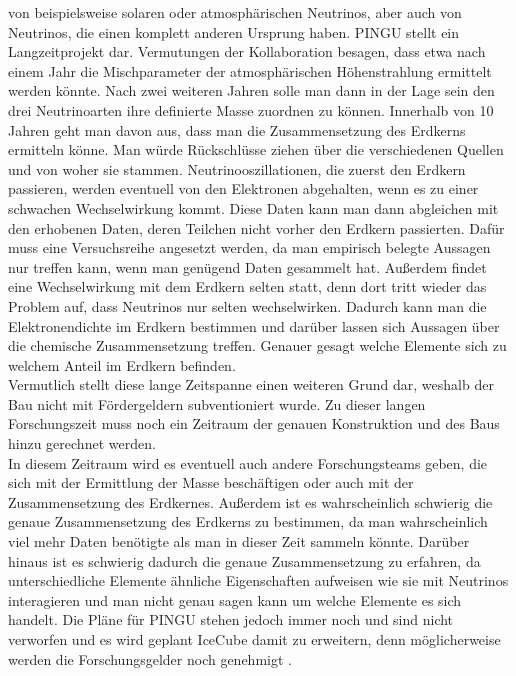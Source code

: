     von beispielsweise solaren oder atmosphärischen Neutrinos, aber auch von Neutrinos, die einen 
    komplett anderen Ursprung haben. PINGU stellt ein Langzeitprojekt dar. Vermutungen der Kollaboration 
    besagen, dass etwa nach einem Jahr die Mischparameter der atmosphärischen Höhenstrahlung ermittelt 
    werden könnte. Nach zwei weiteren Jahren solle man dann in der Lage sein den drei Neutrinoarten 
    ihre definierte Masse zuordnen zu können. Innerhalb von 10 Jahren geht man davon aus, dass man die 
    Zusammensetzung des Erdkerns ermitteln könne. Man würde Rückschlüsse ziehen über die verschiedenen 
    Quellen und von woher sie stammen. Neutrinooszillationen, die zuerst den Erdkern passieren, werden 
    eventuell von den Elektronen abgehalten, wenn es zu einer schwachen Wechselwirkung kommt. 
    Diese Daten kann man dann abgleichen mit den erhobenen Daten, deren Teilchen nicht vorher den 
    Erdkern passierten. Dafür muss eine Versuchsreihe angesetzt werden, da man empirisch belegte 
    Aussagen nur treffen kann, wenn man genügend Daten gesammelt hat. Außerdem findet eine 
    Wechselwirkung mit dem Erdkern selten statt, denn dort tritt wieder das Problem auf, 
    dass Neutrinos nur selten wechselwirken. Dadurch kann man die Elektronendichte im Erdkern 
    bestimmen und darüber lassen sich Aussagen über die chemische Zusammensetzung treffen. 
    Genauer gesagt welche Elemente sich zu welchem Anteil im Erdkern befinden. \\
    Vermutlich stellt diese lange Zeitspanne einen weiteren Grund dar, weshalb der Bau nicht mit 
    Fördergeldern subventioniert wurde. Zu dieser langen Forschungszeit muss noch ein Zeitraum der 
    genauen Konstruktion und des Baus hinzu gerechnet werden. \\
    In diesem Zeitraum wird es eventuell auch andere Forschungsteams geben, die sich mit der 
    Ermittlung der Masse beschäftigen oder auch mit der Zusammensetzung des Erdkernes. 
    Außerdem ist es wahrscheinlich schwierig die genaue Zusammensetzung des Erdkerns zu bestimmen, 
    da man wahrscheinlich viel mehr Daten benötigte als man in dieser Zeit sammeln könnte. 
    Darüber hinaus ist es schwierig dadurch die genaue Zusammensetzung zu erfahren, da unterschiedliche 
    Elemente ähnliche Eigenschaften aufweisen wie sie mit Neutrinos interagieren und man nicht genau 
    sagen kann um welche Elemente es sich handelt. Die Pläne für PINGU stehen jedoch immer noch und sind 
    nicht verworfen und es wird geplant IceCube damit zu erweitern, denn möglicherweise werden die 
    Forschungsgelder noch genehmigt \cite{DaAn18} \cite{PinMar14} \cite{PINGU13}.

